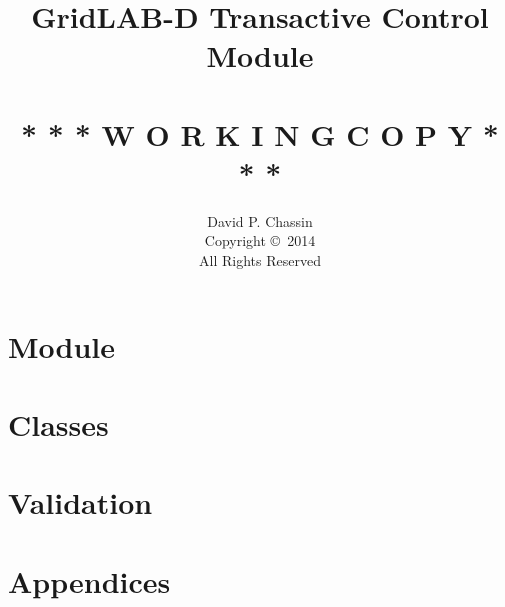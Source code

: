 \documentclass[12pt,letterpaper]{report}
\title{GridLAB-D Transactive Control Module\\\ \\* * * W O R K I N G \quad C O P Y * * *}
\author{David P. Chassin\\Copyright \copyright\ 2014\\All Rights Reserved}
\begin{document}
 \maketitle



\tableofcontents

\part{Module}
	
	

\part{Classes}
	
	

\part{Validation}
	

\part{Appendices}
	
	
 

\end{document}
